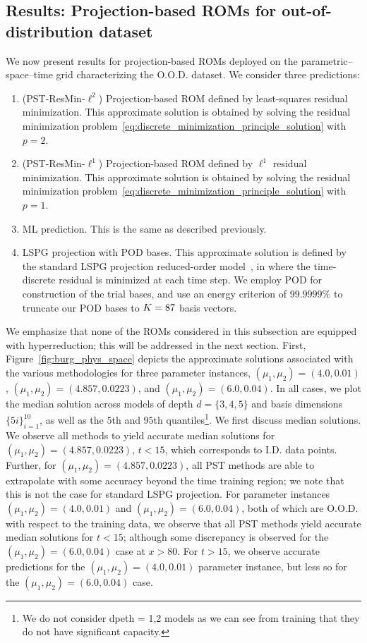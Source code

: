 \documentclass[3p,computermodern,10pt]{elsarticle}
\begin{document}
\subsection{Results: Projection-based ROMs for out-of-distribution dataset}
We now present results for projection-based ROMs deployed on the parametric--space--time grid characterizing the O.O.D. dataset. We consider three predictions: 
\begin{enumerate}
\item (PST-ResMin-$\ell^2$) Projection-based ROM defined by least-squares residual minimization. This approximate solution is obtained by solving the residual minimization problem~\eqref{eq:discrete_minimization_principle_solution} with $p=2$.
 \item (PST-ResMin-$\ell^1$) Projection-based ROM defined by $\ell^1$ residual minimization. This approximate solution is obtained by solving the residual minimization problem~\eqref{eq:discrete_minimization_principle_solution} with $p=1$.
\item ML prediction. This is the same as described previously.
\item LSPG projection with POD bases. This approximate solution is defined by the standard LSPG projection reduced-order model~\cite{bui_thesis,carlberg_lspg,carlberg_lspg_v_galerkin}, in where the time-discrete residual is minimized at each time step. We employ POD for construction of the trial bases, and use an energy criterion of $99.9999\%$ to truncate our POD bases to $K=87$ basis vectors. 
\end{enumerate}
We emphasize that none of the ROMs considered in this subsection are equipped with hyperreduction; this will be addressed in the next section.
First, Figure~\ref{fig:burg_phys_space} depicts the approximate solutions associated with the various methodologies for three parameter instances, $(\mu_1,\mu_2) = (4.0,0.01)$, $(\mu_1,\mu_2) = (4.857,0.0223)$, and $(\mu_1,\mu_2) = (6.0,0.04)$. In all cases, we plot the median solution across models of depth $d=\{3,4,5\}$ and basis dimensions $\{5i\}_{i=1}^{10}$, as well as the $5$th and $95$th quantiles\footnote{We do not consider dpeth = 1,2 models as we can see from training that they do not have significant capacity.}. We first discuss median solutions. We observe all methods to yield accurate median solutions for $(\mu_1,\mu_2) = (4.857,0.0223)$, $t<15$, which corresponds to I.D. data points. Further, for $(\mu_1,\mu_2) = (4.857,0.0223)$, all PST methods are able to extrapolate with some accuracy beyond the time training region; we note that this is not the case for standard LSPG projection. For parameter instances $(\mu_1,\mu_2) = (4.0,0.01)$ and $(\mu_1,\mu_2) = (6.0,0.04)$, both of which are O.O.D. with respect to the training data, we observe that all PST methods yield accurate median solutions for $t<15$; although some discrepancy is observed for the $(\mu_1,\mu_2) = (6.0,0.04)$ case at $x>80$. For $t>15$, we observe accurate predictions for the $(\mu_1,\mu_2) = (4.0,0.01)$ parameter instance, but less so for the $(\mu_1,\mu_2) = (6.0,0.04)$ case. 
\end{document}
